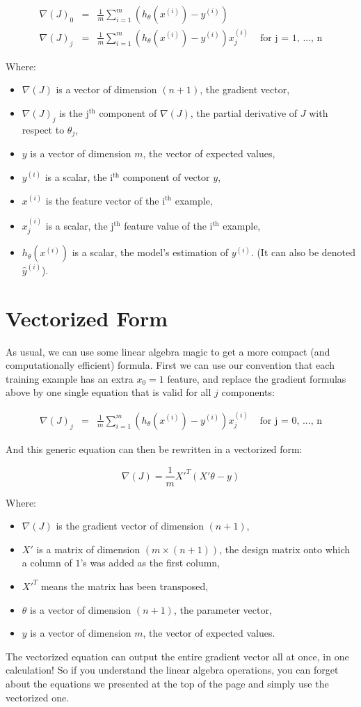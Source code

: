 $$
\begin{matrix}
\nabla(J)_0 &  = &\frac{1}{m}\sum_{i=1}^{m}(h_{\theta}(x^{(i)}) - y^{(i)}) & \\
\nabla(J)_j & = &\frac{1}{m}\sum_{i=1}^{m}(h_{\theta}(x^{(i)}) - y^{(i)})x_{j}^{(i)} & \text{ for j = 1, ..., n}    
\end{matrix}
$$

Where:
\begin{itemize}
    \item $\nabla(J)$ is a vector of dimension $(n + 1)$, the gradient vector,
    \item $\nabla(J)_j$ is the j$^\text{th}$ component of $\nabla(J)$, the partial derivative of $J$ with respect to $\theta_j$,
    \item $y$ is a vector of dimension $m$, the vector of expected values,
    \item $y^{(i)}$ is a scalar, the i$^\text{th}$ component of vector $y$,
    \item $x^{(i)}$ is the feature vector of the i$^\text{th}$ example,
    \item $x^{(i)}_j$ is a scalar, the j$^\text{th}$ feature value of the i$^\text{th}$ example,
    \item $h_{\theta}(x^{(i)})$ is a scalar, the model's estimation of $y^{(i)}$. (It can also be denoted $\hat{y}^{(i)}$).
\end{itemize}


\section*{Vectorized Form}
As usual, we can use some linear algebra magic to get a more compact (and computationally efficient) formula.
First we can use our convention that each training example has an extra $x_0 = 1$ feature, and replace the gradient formulas above by one single equation that is valid for all $j$ components:

$$
\begin{matrix}
\nabla(J)_j & = &\frac{1}{m}\sum_{i=1}^{m}(h_{\theta}(x^{(i)}) - y^{(i)})x_{j}^{(i)} & \text{ for j = 0, ..., n}
\end{matrix}
$$

And this generic equation can then be rewritten in a vectorized form:

$$
\nabla(J) = \frac{1}{m} {X'}^T(X'\theta - y)
$$  

Where:  
\begin{itemize}
    \item $\nabla(J)$ is the gradient vector of dimension $(n + 1)$,
    \item $X'$ is a matrix of dimension $(m \times (n + 1))$, the design matrix onto which a column of $1$'s was added as the first column,
    \item ${X'}^T$ means the matrix has been transposed,
    \item $\theta$ is a vector of dimension $(n + 1)$, the parameter vector, 
    \item $y$ is a vector of dimension $m$, the vector of expected values.
\end{itemize}

The vectorized equation can output the entire gradient vector all at once, in one calculation!
So if you understand the linear algebra operations, you can forget about the equations we presented at the top of the page and simply use the vectorized one.

